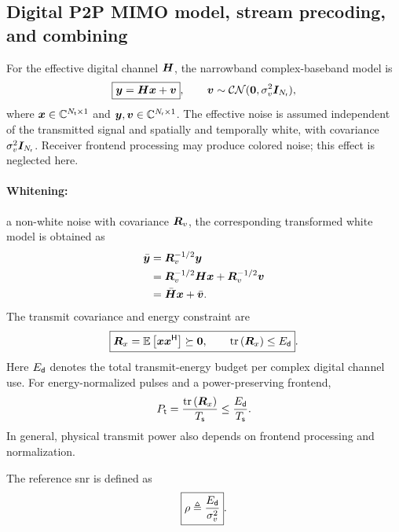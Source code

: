 \subsection{Digital P2P MIMO model, stream precoding, and combining}

For the effective digital channel $\bm{H}$, the narrowband
complex-baseband model is
\begin{equation}\label{eq:model}
	\boxed{\bm{y}=\bm{H}\bm{x}+\bm{v}},
	\qquad
	\bm{v}\sim\mathcal{CN}(\bm{0},\sigma_v^2\bm{I}_{N_{\mathsf{r}}}),
\end{equation}
where $\bm{x}\in\mathbb{C}^{N_{\mathsf{t}}\times1}$ and
$\bm{y},\bm{v}\in\mathbb{C}^{N_{\mathsf{r}}\times1}$.
The effective noise is assumed independent of the transmitted
signal and spatially and temporally white, with covariance
$\sigma_v^2\bm{I}_{N_{\mathsf{r}}}$. Receiver frontend processing may
produce colored noise; this effect is neglected here.
\paragraph*{Whitening:} a non-white noise with covariance $\bm{R}_v$, the corresponding transformed white model is obtained as 
\begin{equation}
	\begin{split}
		\bar{\bm{y}} &= \bm{R}_v^{-1/2} \bm{y} \\
		&= \bm{R}_v^{-1/2} \bm{H} \bm{x} + \bm{R}_v^{-1/2} \bm{v}\\
		&= \bar{\bm{H}} \bm{x} + \bar{\bm{v}}.
	\end{split}
\end{equation} 
The transmit covariance and energy constraint are
\begin{equation}\label{eq:budget}
	\boxed{
		\bm{R}_x=\mathbb{E}\left[\bm{x}{\bm{x}}^{\mathsf{H}}\right]\succeq\bm{0},
		\qquad
		\operatorname{tr}\left(\bm{R}_x\right)\leq E_{\mathsf{d}}}.
\end{equation}
Here $E_{\mathsf{d}}$ denotes the total transmit-energy budget per
complex digital channel use. For energy-normalized pulses
and a power-preserving frontend,
\begin{equation*}
	P_{\mathsf{t}}=\frac{\operatorname{tr}\left(\bm{R}_x\right)}{T_{\mathsf s}}
	\leq\frac{E_{\mathsf{d}}}{T_{\mathsf s}}.
\end{equation*}
In general, physical transmit power also depends on
frontend processing and normalization.

The reference \ac{snr} is defined as
\begin{equation}\label{eq:rho}
	\boxed{\rho\triangleq\frac{E_{\mathsf{d}}}{\sigma_v^2}}.
\end{equation}

